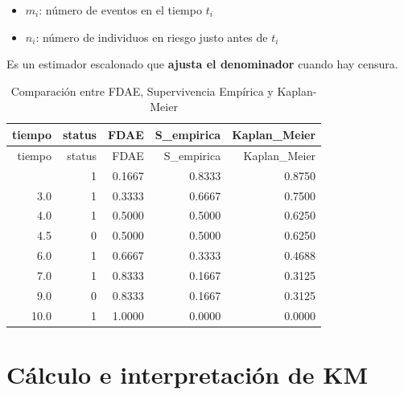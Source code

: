 \documentclass[
]{article}
\providecommand{\tightlist}{%
  \setlength{\itemsep}{0pt}\setlength{\parskip}{0pt}}
\begin{document}
\begin{itemize}
\tightlist
\item
  \(m_i\): número de eventos en el tiempo \(t_i\)
\item
  \(n_i\): número de individuos en riesgo justo antes de \(t_i\)
\end{itemize}

Es un estimador escalonado que \textbf{ajusta el denominador} cuando hay
censura.

\begin{tcolorbox}[enhanced jigsaw, rightrule=.15mm, toprule=.15mm, colback=white, bottomrule=.15mm, bottomtitle=1mm, left=2mm, leftrule=.75mm, arc=.35mm, breakable, title=\textcolor{quarto-callout-note-color}{\faInfo}\hspace{0.5em}{Ejemplo}, opacitybacktitle=0.6, colframe=quarto-callout-note-color-frame, opacityback=0, toptitle=1mm, coltitle=black, titlerule=0mm, colbacktitle=quarto-callout-note-color!10!white]

\begin{longtable}[]{@{}rrrrr@{}}
\caption{Comparación entre FDAE, Supervivencia Empírica y
Kaplan-Meier}\tabularnewline
\toprule\noalign{}
tiempo & status & FDAE & S\_empirica & Kaplan\_Meier \\
\midrule\noalign{}
\endfirsthead
\toprule\noalign{}
tiempo & status & FDAE & S\_empirica & Kaplan\_Meier \\
\midrule\noalign{}
\endhead
\bottomrule\noalign{}
\endlastfoot
2.0 & 1 & 0.1667 & 0.8333 & 0.8750 \\
3.0 & 1 & 0.3333 & 0.6667 & 0.7500 \\
4.0 & 1 & 0.5000 & 0.5000 & 0.6250 \\
4.5 & 0 & 0.5000 & 0.5000 & 0.6250 \\
6.0 & 1 & 0.6667 & 0.3333 & 0.4688 \\
7.0 & 1 & 0.8333 & 0.1667 & 0.3125 \\
9.0 & 0 & 0.8333 & 0.1667 & 0.3125 \\
10.0 & 1 & 1.0000 & 0.0000 & 0.0000 \\
\end{longtable}

\end{tcolorbox}

\section{Cálculo e interpretación de
KM}\label{cuxe1lculo-e-interpretaciuxf3n-de-km}
\end{document}

